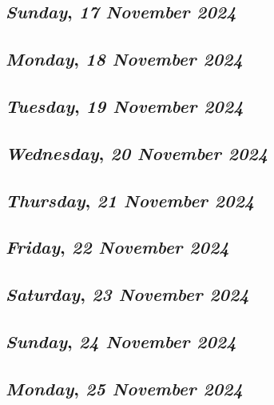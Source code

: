 \def\day{\textit{17 November 2024}}
\def\weekday{\textit{Sunday}}
\subsection*{\weekday, \day}

\def\day{\textit{18 November 2024}}
\def\weekday{\textit{Monday}}
\subsection*{\weekday, \day}

\def\day{\textit{19 November 2024}}
\def\weekday{\textit{Tuesday}}
\subsection*{\weekday, \day}

\def\day{\textit{20 November 2024}}
\def\weekday{\textit{Wednesday}}
\subsection*{\weekday, \day}

\def\day{\textit{21 November 2024}}
\def\weekday{\textit{Thursday}}
\subsection*{\weekday, \day}

\def\day{\textit{22 November 2024}}
\def\weekday{\textit{Friday}}
\subsection*{\weekday, \day}

\def\day{\textit{23 November 2024}}
\def\weekday{\textit{Saturday}}
\subsection*{\weekday, \day}

\def\day{\textit{24 November 2024}}
\def\weekday{\textit{Sunday}}
\subsection*{\weekday, \day}

\def\day{\textit{25 November 2024}}
\def\weekday{\textit{Monday}}
\subsection*{\weekday, \day}

